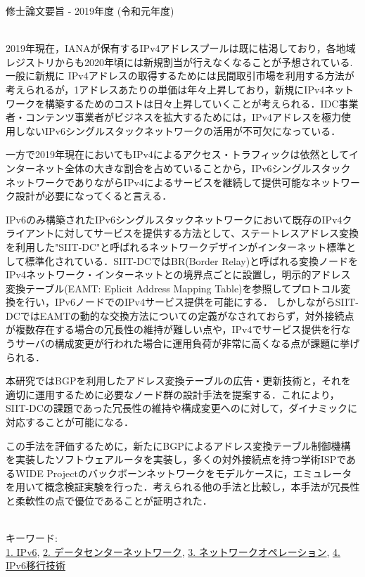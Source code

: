 修士論文要旨 - 2019年度 (令和元年度)
\begin{center}
\begin{large}
\end{large}
\end{center}

~ \\

2019年現在，IANAが保有するIPv4アドレスプールは既に枯渇しており，各地域レジストリからも2020年頃には新規割当が行えなくなることが予想されている.
一般に新規に IPv4アドレスの取得するためには民間取引市場を利用する方法が考えられるが，1アドレスあたりの単価は年々上昇しており，新規にIPv4ネットワークを構築するためのコストは日々上昇していくことが考えられる．IDC事業者・コンテンツ事業者がビジネスを拡大するためには，IPv4アドレスを極力使用しないIPv6シングルスタックネットワークの活用が不可欠になっている．

一方で2019年現在においてもIPv4によるアクセス・トラフィックは依然としてインターネット全体の大きな割合を占めていることから，IPv6シングルスタックネットワークでありながらIPv4によるサービスを継続して提供可能なネットワーク設計が必要になってくると言える．


IPv6のみ構築されたIPv6シングルスタックネットワークにおいて既存のIPv4クライアントに対してサービスを提供する方法として、ステートレスアドレス変換を利用した"SIIT-DC"と呼ばれるネットワークデザインがインターネット標準として標準化されている．SIIT-DCではBR(Border Relay)と呼ばれる変換ノードをIPv4ネットワーク・インターネットとの境界点ごとに設置し，明示的アドレス変換テーブル(EAMT: Eplicit Address Mapping Table)を参照してプロトコル変換を行い，IPv6ノードでのIPv4サービス提供を可能にする．
しかしながらSIIT-DCではEAMTの動的な交換方法についての定義がなされておらず，対外接続点が複数存在する場合の冗長性の維持が難しい点や，IPv4でサービス提供を行なうサーバの構成変更が行われた場合に運用負荷が非常に高くなる点が課題に挙げられる．

本研究ではBGPを利用したアドレス変換テーブルの広告・更新技術と，それを適切に運用するために必要なノード群の設計手法を提案する．これにより，SIIT-DCの課題であった冗長性の維持や構成変更へのに対して，ダイナミックに対応することが可能になる．

この手法を評価するために，新たにBGPによるアドレス変換テーブル制御機構を実装したソフトウェアルータを実装し，多くの対外接続点を持つ学術ISPであるWIDE Projectのバックボーンネットワークをモデルケースに，エミュレータを用いて概念検証実験を行った．考えられる他の手法と比較し，本手法が冗長性と柔軟性の点で優位であることが証明された．







~ \\
キーワード:\\
\underline{1. IPv6},
\underline{2. データセンターネットワーク},
\underline{3. ネットワークオペレーション},
\underline{4. IPv6移行技術}
\begin{flushright}
\dept \\
\author
\end{flushright}
